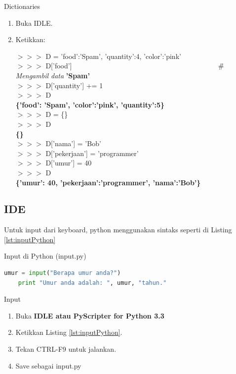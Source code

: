 \begin{panduan}{Dictionaries}
\begin{enumerate}
	\item Buka IDLE.
	\item Ketikkan:
		\begin{IDLE}
		\begin{tabbing}
		$>>>$ D = {'food':'Spam', 'quantity':4, 'color':'pink'} \\
		$>>>$ D['food'] ~~~~~~~~~~~~~~~~~~~~~~~~~~~~~~~~~~~~~~~~~ \=  \# \textit{Mengambil data}
		\textbf{'Spam'} \\
		$>>>$ D['quantity'] += 1 \\
		$>>>$ D \\ 
		\textbf{\{'food': 'Spam', 'color':'pink', 'quantity':5\}} \\
		$>>>$ D = \{\} \\
		$>>>$ D \\
		\textbf{\{\}}\\
		$>>>$ D['nama'] = 'Bob' \\
		$>>>$ D['pekerjaan'] = 'programmer' \\
		$>>>$ D['umur'] = 40 \\
		$>>>$ D \\
		\textbf{\{'umur': 40, 'pekerjaan':'programmer', 'nama':'Bob'\}}
		\end{tabbing}
		\end{IDLE}	
\end{enumerate}
\end{panduan}

\subsection{IDE}
Untuk input dari keyboard, python menggunakan sintaks seperti di Listing \ref{lst:inputPython}
\begin{listprog}{Input di Python (input.py)}
	\label{lst:inputPython}
	\begin{lstlisting}[language=Python]
	umur = input("Berapa umur anda?")
	print "Umur anda adalah: ", umur, "tahun."
	\end{lstlisting}
\end{listprog}
\begin{panduan}{Input}
\begin{enumerate}
	\item Buka \textbf{IDLE atau PyScripter for Python 3.3}
	\item Ketikkan Listing \ref{lst:inputPython}.
	\item Tekan CTRL-F9 untuk jalankan.
	\item Save sebagai input.py
\end{enumerate}
\end{panduan}